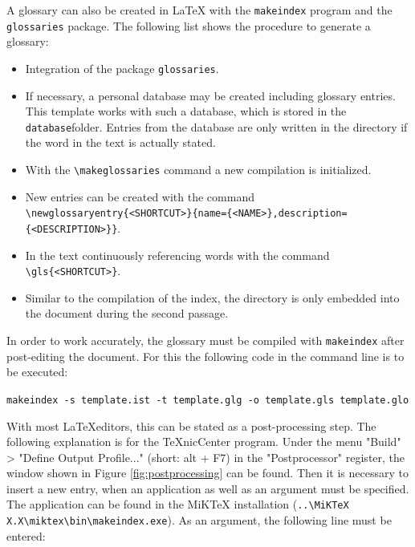A glossary can also be created in \LaTeX{} with the \texttt{makeindex} program and the \texttt{glossaries} package. The following list shows the procedure to generate a glossary:

\begin{itemize}
	\item Integration of the package \texttt{glossaries}.
	\item If necessary, a personal database may be created including glossary entries. This template works with such a database, which is stored in the \texttt{database}folder. Entries from the database are only written in the directory if the word in the text is actually stated.
	\item With the \texttt{\textbackslash makeglossaries} command a new compilation is initialized.
	\item New entries can be created with the command \\ \texttt{\textbackslash newglossaryentry\{<SHORTCUT>\}\{name=\{<NAME>\},description=\{<DESCRIPTION>\}\}}.
	\item In the text continuously referencing words with the command \texttt{\textbackslash gls\{<SHORTCUT>\}}.
	\item Similar to the compilation of the index, the directory is only embedded into the document  during the second passage.
\end{itemize}

In order to work accurately, the glossary must be compiled with \texttt{makeindex} after post-editing the document. For this the following code in the command line is to be executed:

\begin{center}
	\texttt{makeindex -s template.ist -t template.glg -o template.gls template.glo}
\end{center}

With most \LaTeX editors, this can be stated as a post-processing step. The following explanation is for the TeXnicCenter program. Under the menu "Build" > "Define Output Profile..." (short: alt + F7) in the "Postprocessor" register, the window shown in Figure \ref{fig:postprocessing} can be found. Then it is necessary to insert a new entry, when an application as well as an argument must be specified. The application can be found in the MiKTeX installation (\texttt{..\textbackslash MiKTeX X.X\textbackslash miktex\textbackslash bin\textbackslash makeindex.exe}). As an argument, the following line must be entered:

